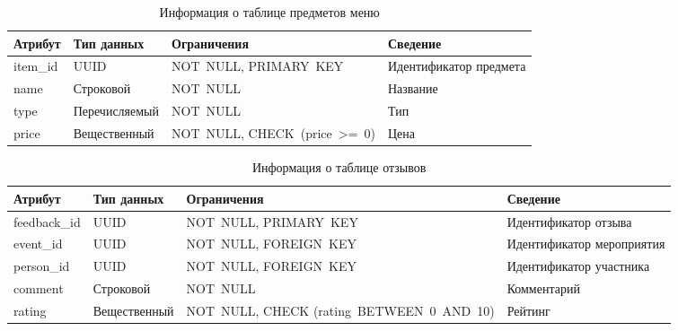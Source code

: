 \begin{table}[h!]
	\centering
	\caption{Информация о таблице предметов меню}
	\begin{tabularx}{\textwidth}{|p{2.6cm}|X|p{6cm}|X|}
		\hline
		\textbf{Атрибут} & \textbf{Тип данных} & \textbf{Ограничения} & \textbf{Сведение} \\
		\hline
		item\_id & UUID & NOT~NULL, \newline PRIMARY~KEY & Идентификатор предмета \\
		\hline
		name & Строковой & NOT~NULL & Название \\
		\hline
		type & Перечисляемый & NOT~NULL & Тип \\
		\hline
		price & Вещественный & NOT~NULL, \newline CHECK~(price~>=~0) & Цена \\
		\hline
	\end{tabularx}
	\label{tbl:items}
\end{table}

\begin{table}[h!]
	\centering
	\caption{Информация о таблице отзывов}
	\begin{tabularx}{\textwidth}{|p{2.6cm}|X|p{6cm}|X|}
		\hline
		\textbf{Атрибут} & \textbf{Тип данных} & \textbf{Ограничения} & \textbf{Сведение} \\
		\hline
		feedback\_id & UUID & NOT~NULL, \newline PRIMARY~KEY & Идентификатор отзыва \\
		\hline
		event\_id & UUID & NOT~NULL, \newline FOREIGN~KEY & Идентификатор мероприятия \\
		\hline
		person\_id & UUID & NOT~NULL, \newline FOREIGN~KEY & Идентификатор участника \\
		\hline
		comment & Строковой & NOT~NULL & Комментарий \\
		\hline
		rating & Вещественный & NOT~NULL, \newline CHECK (rating~BETWEEN~0~AND~10) & Рейтинг \\
		\hline
	\end{tabularx}
	\label{tbl:feedbacks}
\end{table}

